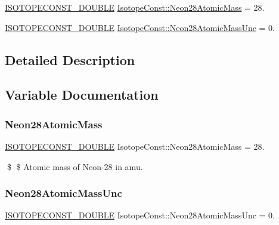 \begin{DoxyCompactItemize}
\item 
\mbox{\hyperlink{group___isotope_const-_macros_ga8f45a7272ce02c0b4c65c44636ed719a}{I\+S\+O\+T\+O\+P\+E\+C\+O\+N\+S\+T\+\_\+\+D\+O\+U\+B\+LE}} \mbox{\hyperlink{group___isotope_const-_neon-_ne28_ga35acc4e0914c1077ba8d36afe369fb84}{Isotope\+Const\+::\+Neon28\+Atomic\+Mass}} = 28.
\item 
\mbox{\hyperlink{group___isotope_const-_macros_ga8f45a7272ce02c0b4c65c44636ed719a}{I\+S\+O\+T\+O\+P\+E\+C\+O\+N\+S\+T\+\_\+\+D\+O\+U\+B\+LE}} \mbox{\hyperlink{group___isotope_const-_neon-_ne28_gac5b58c70864d896131c03c66d4c6dd70}{Isotope\+Const\+::\+Neon28\+Atomic\+Mass\+Unc}} = 0.
\end{DoxyCompactItemize}


\subsection{Detailed Description}


\subsection{Variable Documentation}
\mbox{\label{group___isotope_const-_neon-_ne28_ga35acc4e0914c1077ba8d36afe369fb84}} 
\subsubsection{\texorpdfstring{Neon28\+Atomic\+Mass}{Neon28AtomicMass}}
{\footnotesize\ttfamily \mbox{\hyperlink{group___isotope_const-_macros_ga8f45a7272ce02c0b4c65c44636ed719a}{I\+S\+O\+T\+O\+P\+E\+C\+O\+N\+S\+T\+\_\+\+D\+O\+U\+B\+LE}} Isotope\+Const\+::\+Neon28\+Atomic\+Mass = 28.}

\$ \$ Atomic mass of Neon-\/28 in amu. \mbox{\label{group___isotope_const-_neon-_ne28_gac5b58c70864d896131c03c66d4c6dd70}} 
\subsubsection{\texorpdfstring{Neon28\+Atomic\+Mass\+Unc}{Neon28AtomicMassUnc}}
{\footnotesize\ttfamily \mbox{\hyperlink{group___isotope_const-_macros_ga8f45a7272ce02c0b4c65c44636ed719a}{I\+S\+O\+T\+O\+P\+E\+C\+O\+N\+S\+T\+\_\+\+D\+O\+U\+B\+LE}} Isotope\+Const\+::\+Neon28\+Atomic\+Mass\+Unc = 0.}

